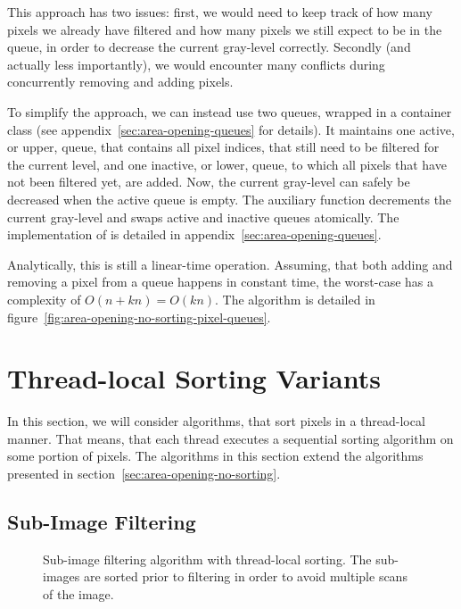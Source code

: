 This approach has two issues: first, we would need to keep track of how many
pixels we already have filtered and how many pixels we still expect to be in the
queue, in order to decrease the current gray-level correctly. Secondly (and
actually less importantly), we would encounter many conflicts during
concurrently removing and adding pixels.

To simplify the approach, we can instead use two queues, wrapped in a container
class  (see appendix~\ref{sec:area-opening-queues} for
details). It maintains one active, or upper, queue, that contains all pixel
indices, that still need to be filtered for the current level, and one inactive,
or lower, queue, to which all pixels that have not been filtered yet, are
added. Now, the current gray-level can safely be decreased when the active queue
is empty. The auxiliary function  decrements the
current gray-level and swaps active and inactive queues atomically. The
implementation of  is detailed in
appendix~\ref{sec:area-opening-queues}.

Analytically, this is still a linear-time operation. Assuming, that both adding
and removing a pixel from a queue happens in constant time, the worst-case has a
complexity of $O(n + kn) = O(kn)$. The algorithm is detailed in
figure~\ref{fig:area-opening-no-sorting-pixel-queues}.

\section{Thread-local Sorting Variants}
\label{sec:area-opening-local-sorting}

In this section, we will consider algorithms, that sort pixels in a thread-local
manner. That means, that each thread executes a sequential sorting algorithm on
some portion of pixels. The algorithms in this section extend the algorithms
presented in section~\ref{sec:area-opening-no-sorting}.

\subsection{Sub-Image Filtering}
\label{sec:area-opening-local-sorting-sub-image}

\begin{figure}
  \centering

  

  \caption[Sub-image filtering algorithm with thread-local sorting.]{Sub-image
    filtering algorithm with thread-local sorting. The sub-images are sorted
    prior to filtering in order to avoid multiple scans of the image.}
  \label{fig:area-opening-local-sorting-sub-image}
\end{figure}

